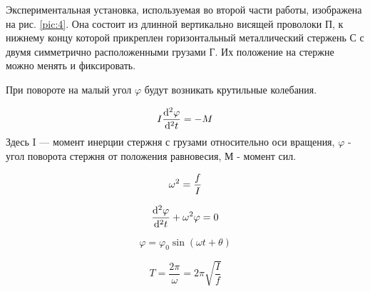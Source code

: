 \documentclass[a4paper,12pt]{article}
\numberwithin{equation}{section}
\begin{document}
Экспериментальная установка, используемая во второй части работы,
изображена на рис. \ref{pic:4}. Она состоит из длинной вертикально висящей проволоки П, к нижнему концу которой прикреплен горизонтальный металлический стержень С с двумя симметрично расположенными грузами Г. Их положение на стержне можно менять и фиксировать.

При повороте на малый угол $\varphi$ будут возникать крутильные колебания.

\begin{equation}
  I \deriv[2]{\varphi}{t} = -M \label{eq:2.8}
\end{equation}
Здесь I — момент инерции стержня с грузами относительно оси вращения, $\varphi$ - угол поворота стержня от положения равновесия, М - момент сил.

\begin{equation}
  \w^2 = \frac{f}{I} \label{eq:2.9}
\end{equation}

\begin{equation}
  \deriv[2]{\varphi}{t} + \w^2\varphi = 0 \label{eq:2.10}
\end{equation}

\begin{equation}
  \varphi = \varphi_0 \sin{(\omega t + \theta)} \label{eq:2.11}
\end{equation}

\begin{equation}
  T = \frac{2\pi}{\omega} = 2\pi \sqrt{\frac{I}{f}} \label{eq:2.12}
\end{equation}
\end{document}
